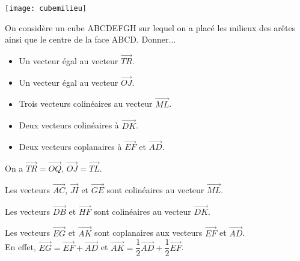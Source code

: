 \documentclass[11pt,fleqn, openany]{book} %
\begin{document}
\begin{exercise}
\vskip10pt

\begin{minipage}{0.3\linewidth}
 \begin{center}
\texttt{[image: cubemilieu]}
\end{center}
\end{minipage}\hfill\begin{minipage}{0.6\linewidth}
On considère un cube ABCDEFGH sur lequel on a placé les milieux des arêtes ainsi que le centre de la face ABCD. Donner...
\begin{itemize}
\item Un vecteur égal au vecteur $\overrightarrow{TR}$.
\item Un vecteur égal au vecteur $\overrightarrow{OJ}$.
\item Trois vecteurs colinéaires au vecteur $\overrightarrow{ML}$.
\item Deux vecteurs colinéaires à $\overrightarrow{DK}$.
\item Deux vecteurs coplanaires à $\overrightarrow{EF}$ et $\overrightarrow{AD}$.
\end{itemize}\end{minipage}
\vspace{-0.5cm}\end{exercise}

\begin{solution}On a $\overrightarrow{TR}=\overrightarrow{OQ}$,  $\overrightarrow{OJ}=\overrightarrow{TL}$.

Les vecteurs $\overrightarrow{AC}$, $\overrightarrow{JI}$ et $\overrightarrow{GE}$ sont colinéaires au vecteur $\overrightarrow{ML}$.

Les vecteurs $\overrightarrow{DB}$ et $\overrightarrow{HF}$ sont colinéaires au vecteur $\overrightarrow{DK}$.

Les vecteurs $\overrightarrow{EG}$ et $\overrightarrow{AK}$ sont coplanaires aux vecteurs $\overrightarrow{EF}$ et $\overrightarrow{AD}$. \\ En effet, $\overrightarrow{EG}=\overrightarrow{EF}+\overrightarrow{AD}$ et $\overrightarrow{AK}=\dfrac{1}{2}\overrightarrow{AD}+\dfrac{1}{2}\overrightarrow{EF}$.\end{solution}
\end{document}
